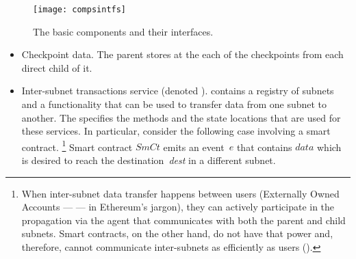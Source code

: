 \begin{figure}[h]
     \centering
     \texttt{[image: compsintfs]}
     \caption{The basic components and their interfaces.}
     \label{fig:interfaces}
 \end{figure}


\begin{itemize}
    \item Checkpoint data. The parent stores at the \gw each of the checkpoints from each direct child of it.
    \item Inter-subnet transactions service (denoted \postoffice). 
    \gw contains a registry of subnets and a functionality that can be used to transfer data from one subnet to another. 
    The \postoffice specifies the methods and the state locations that are used for these services.
    In particular, consider the following case involving a smart contract.%
    \footnote{When inter-subnet data transfer happens between users (Externally Owned Accounts --- \eoa --- in Ethereum's jargon), they can actively participate in the propagation via the \ipc agent that communicates with both the parent and child subnets. Smart contracts, on the other hand, do not have that power and, therefore, cannot communicate inter-subnets as efficiently as users (\eoa).}
    Smart contract $\textit{SmCt}$ emits an event~$e$ that contains $\textit{data}$ which is desired to reach the destination~\textit{dest} in a different subnet.
\end{itemize}
 
 
 
